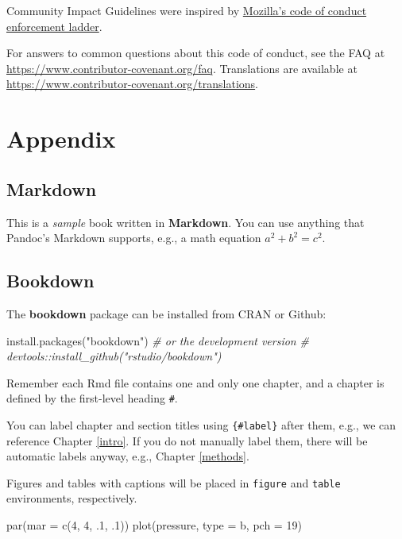 \documentclass[
  fontsize=13pt,
  english,
  a4paper,
  openany, a4paper, oneside]{article}
\newenvironment{Shaded}{\begin{snugshade}}{\end{snugshade}}
\newcommand{\AttributeTok}[1]{\textcolor[rgb]{0.77,0.63,0.00}{#1}}
\newcommand{\CommentTok}[1]{\textcolor[rgb]{0.56,0.35,0.01}{\textit{#1}}}
\newcommand{\DecValTok}[1]{\textcolor[rgb]{0.00,0.00,0.81}{#1}}
\newcommand{\FunctionTok}[1]{\textcolor[rgb]{0.00,0.00,0.00}{#1}}
\newcommand{\NormalTok}[1]{#1}
\newcommand{\StringTok}[1]{\textcolor[rgb]{0.31,0.60,0.02}{#1}}
\begin{document}
Community Impact Guidelines were inspired by
\href{https://github.com/mozilla/diversity}{Mozilla's code of conduct enforcement ladder}.

For answers to common questions about this code of conduct, see the FAQ at
\url{https://www.contributor-covenant.org/faq}. Translations are available
at \url{https://www.contributor-covenant.org/translations}.

\hypertarget{appendix}{%
\section{Appendix}\label{appendix}}

\hypertarget{markdown-1}{%
\subsection{Markdown}\label{markdown-1}}

This is a \emph{sample} book written in \textbf{Markdown}. You can use anything that Pandoc's Markdown supports, e.g., a math equation \(a^2 + b^2 = c^2\).

\hypertarget{bookdown}{%
\subsection{Bookdown}\label{bookdown}}

The \textbf{bookdown} package can be installed from CRAN or Github:

\begin{Shaded}
\begin{Highlighting}[]
\FunctionTok{install.packages}\NormalTok{(}\StringTok{"bookdown"}\NormalTok{)}
\CommentTok{\# or the development version}
\CommentTok{\# devtools::install\_github("rstudio/bookdown")}
\end{Highlighting}
\end{Shaded}

Remember each Rmd file contains one and only one chapter, and a chapter is defined by the first-level heading \texttt{\#}.

You can label chapter and section titles using \texttt{\{\#label\}} after them, e.g., we can reference Chapter \ref{intro}. If you do not manually label them, there will be automatic labels anyway, e.g., Chapter \ref{methods}.

Figures and tables with captions will be placed in \texttt{figure} and \texttt{table} environments, respectively.

\begin{Shaded}
\begin{Highlighting}[]
\FunctionTok{par}\NormalTok{(}\AttributeTok{mar =} \FunctionTok{c}\NormalTok{(}\DecValTok{4}\NormalTok{, }\DecValTok{4}\NormalTok{, .}\DecValTok{1}\NormalTok{, .}\DecValTok{1}\NormalTok{))}
\FunctionTok{plot}\NormalTok{(pressure, }\AttributeTok{type =} \StringTok{\textquotesingle{}b\textquotesingle{}}\NormalTok{, }\AttributeTok{pch =} \DecValTok{19}\NormalTok{)}
\end{Highlighting}
\end{Shaded}
\end{document}
